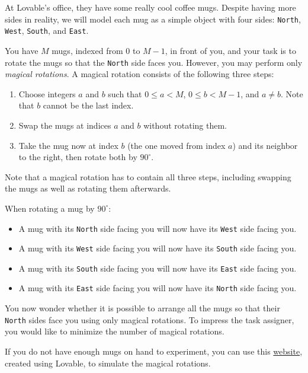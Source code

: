 

At Lovable's office, they have some really cool coffee mugs. 
Despite having more sides in reality, we will model each mug as a simple object with four sides: \texttt{North}, \texttt{West}, \texttt{South}, and \texttt{East}.

You have $M$ mugs, indexed from $0$ to $M-1$, in front of you, 
and your task is to rotate the mugs so that the \texttt{North} side faces you. 
However, you may perform only \emph{magical rotations}. 
A magical rotation consists of the following three steps:
\begin{enumerate}
  \item Choose integers $a$ and $b$ such that $0 \le a < M$, $0 \le b < M-1$, and $a \neq b$. Note that $b$ cannot be the last index.
  \item Swap the mugs at indices $a$ and $b$ without rotating them.
  \item Take the mug now at index $b$ (the one moved from index $a$) and its neighbor to the right, then rotate both by $90^\circ$.
\end{enumerate}
Note that a magical rotation has to contain all three steps, including swapping the mugs as well as rotating them afterwards.



When rotating a mug by $90^\circ$:
\begin{itemize}
  \item A mug with its \texttt{North} side facing you will now have its \texttt{West} side facing you.
  \item A mug with its \texttt{West} side facing you will now have its \texttt{South} side facing you.
  \item A mug with its \texttt{South} side facing you will now have its \texttt{East} side facing you.
  \item A mug with its \texttt{East} side facing you will now have its \texttt{North} side facing you.
\end{itemize}

You now wonder whether it is possible to arrange all the mugs so that their \texttt{North} sides face you using only magical rotations. To impress the task assigner, you would like to minimize the number of magical rotations.

If you do not have enough mugs on hand to experiment, you can use this \href{https://rotatingmugs.lovable.app/}{website}, created using Lovable, to simulate the magical rotations.
